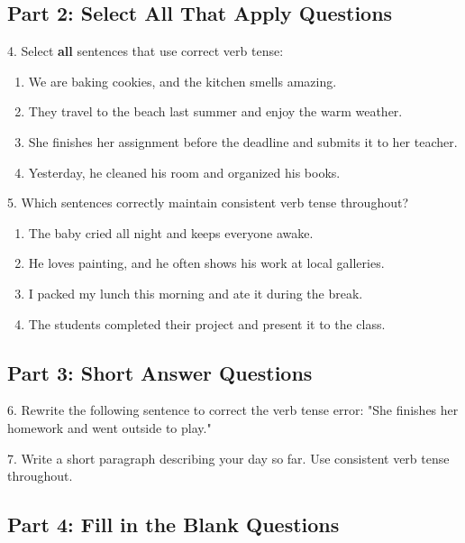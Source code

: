 \documentclass[12pt]{article}
\begin{document}
\vspace{1cm}

\subsection*{Part 2: Select All That Apply Questions}

4. Select \textbf{all} sentences that use correct verb tense:  
\begin{enumerate}[label=\Alph*.]
    \item We are baking cookies, and the kitchen smells amazing.  
    \item They travel to the beach last summer and enjoy the warm weather.  
    \item She finishes her assignment before the deadline and submits it to her teacher.  
    \item Yesterday, he cleaned his room and organized his books.  
\end{enumerate}

\vspace{1cm}

5. Which sentences correctly maintain consistent verb tense throughout?  
\begin{enumerate}[label=\Alph*.]
    \item The baby cried all night and keeps everyone awake.  
    \item He loves painting, and he often shows his work at local galleries.  
    \item I packed my lunch this morning and ate it during the break.  
    \item The students completed their project and present it to the class.  
\end{enumerate}

\vspace{1cm}

\subsection*{Part 3: Short Answer Questions}

6. Rewrite the following sentence to correct the verb tense error:  
"She finishes her homework and went outside to play."  
\vspace{3cm}

7. Write a short paragraph describing your day so far. Use consistent verb tense throughout.  
\vspace{5cm}

\subsection*{Part 4: Fill in the Blank Questions}
\end{document}
